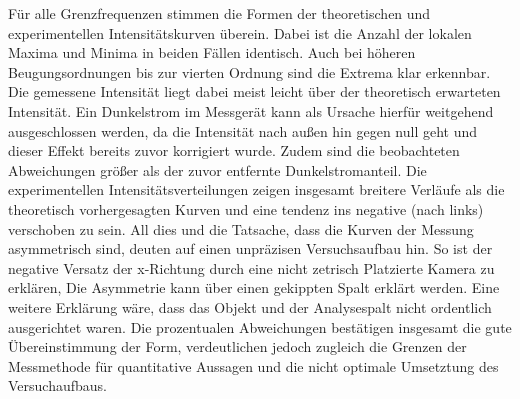 Für alle Grenzfrequenzen stimmen die Formen der theoretischen und experimentellen Intensitätskurven überein. Dabei ist die Anzahl der lokalen Maxima und Minima in beiden Fällen identisch. Auch bei höheren Beugungsordnungen bis zur vierten Ordnung sind die Extrema klar erkennbar.
Die gemessene Intensität liegt dabei meist leicht über der theoretisch erwarteten Intensität. Ein Dunkelstrom im Messgerät kann als Ursache hierfür weitgehend ausgeschlossen werden, da die Intensität nach außen hin gegen null geht und dieser Effekt bereits zuvor korrigiert wurde. Zudem sind die beobachteten Abweichungen größer als der zuvor entfernte Dunkelstromanteil.
Die experimentellen Intensitätsverteilungen zeigen insgesamt breitere Verläufe als die theoretisch vorhergesagten Kurven und eine tendenz ins negative (nach links) verschoben zu sein.
All dies und die Tatsache, dass die Kurven der Messung asymmetrisch sind, deuten auf einen unpräzisen Versuchsaufbau hin. So ist der negative Versatz der x-Richtung durch eine nicht zetrisch Platzierte Kamera zu erklären, Die Asymmetrie kann über einen gekippten Spalt erklärt werden. Eine weitere Erklärung wäre, dass das Objekt und der Analysespalt nicht ordentlich ausgerichtet waren. 
Die prozentualen Abweichungen bestätigen insgesamt die gute Übereinstimmung der Form, verdeutlichen jedoch zugleich die Grenzen der Messmethode für quantitative Aussagen und die nicht optimale Umsetztung des Versuchaufbaus. 

